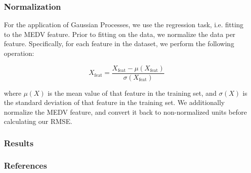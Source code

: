 \documentclass[pdf]{beamer}
\begin{document}
\begin{frame}
  \frametitle{Normalization}

For the application of Gaussian Processes, we use the regression task, i.e. fitting to the MEDV feature. Prior to
fitting on the data, we normalize the data per feature. Specifically, for each feature in the dataset, we perform the
following operation:

\[
  X_{\text{feat}} = \frac{X_{\text{feat}} - \mu(X_{\text{feat}})}{\sigma(X_{\text{feat}})}
\]

where $\mu(X)$ is the mean value of that feature in the training set, and $\sigma(X)$ is the standard deviation of that
feature in the training set. We additionally normalize the MEDV feature, and convert it back to non-normalized units
before calculating our RMSE.
\end{frame}

\begin{frame}
  \frametitle{Results}
\end{frame}

\begin{frame}
  \frametitle{References}
  
  
\end{frame}
\end{document}

